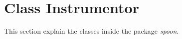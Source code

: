 \section{Class Instrumentor}\label{sec:ClassInstr}
This section explain the classes inside the package \textit{spoon}.\\
